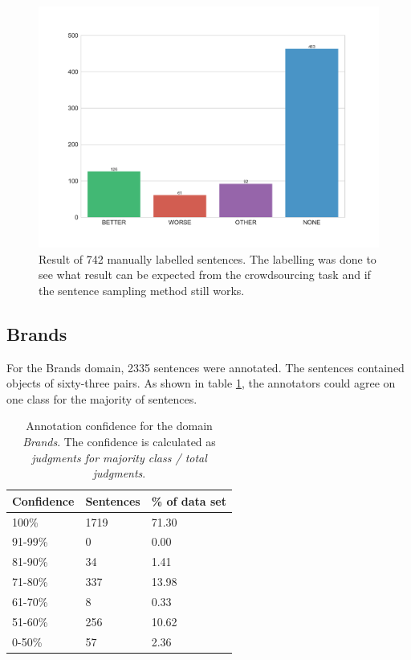 \begin{figure}[h]
\centering
\caption{Result of 742 manually labelled sentences. The labelling was done to see what result can be expected from the crowdsourcing task and if the sentence sampling method still works.}
\label{fig:sample}
\includegraphics[width=1\linewidth]{images/dataset/pre-dist}
\end{figure}
\FloatBarrier
\subsection{Brands}
\label{sec:brands}

For the Brands domain, 2335 sentences were annotated. The sentences contained objects of sixty-three pairs. As shown in table \ref{fig:brand_agg}, the annotators could agree on one class for the majority of sentences.


\begin{table}[h]
\caption{Annotation confidence for the domain \emph{Brands}. The confidence is calculated as \emph{judgments for majority class / total judgments}.}
\label{fig:brand_agg}
\begin{tabularx}{\textwidth}{XXX}
\toprule
Confidence & Sentences & \% of data set \\
\midrule
100\%	&	1719	&	71.30	 \\ 
91-99\%	&	0	&	0.00	 \\ 
81-90\%	&	34	&	1.41	 \\ 
71-80\%	&	337	&	13.98	 \\ 
61-70\%	&	8	&	0.33	 \\ 
51-60\%	&	256	&	10.62	 \\ 
0-50\%	&	57	&	2.36	 \\ 
\bottomrule
\end{tabularx}
\end{table}



